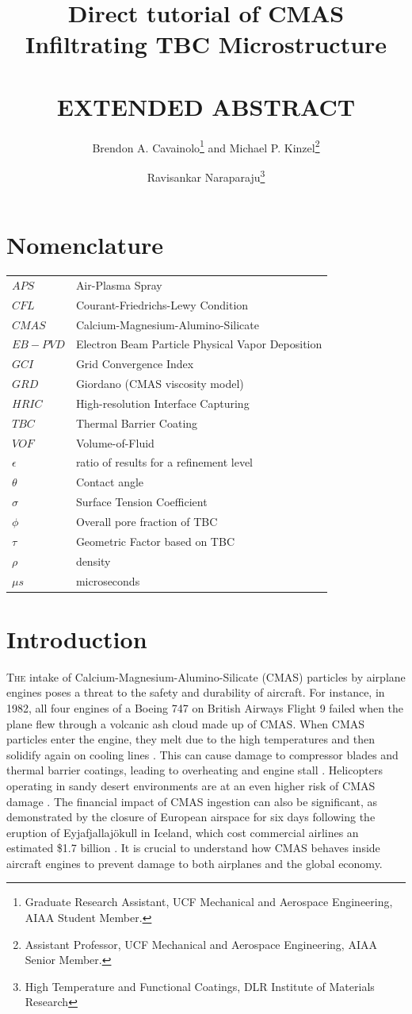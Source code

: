 \documentclass[conf]{new-aiaa}
\title{Direct tutorial of CMAS Infiltrating TBC Microstructure \\
\\
\textbf{EXTENDED ABSTRACT}}
\author{Brendon A. Cavainolo\footnote{Graduate Research Assistant, UCF Mechanical and Aerospace Engineering, AIAA Student Member.} and Michael P. Kinzel\footnote{Assistant Professor, UCF Mechanical and Aerospace Engineering, AIAA Senior Member.}}
\affil{University of Central Florida (UCF), Orlando, FL, 32816, United States}
\author{Ravisankar Naraparaju\footnote{High Temperature and Functional Coatings, DLR Institute of Materials Research}}
\affil{German Aerospace Center (DLR), Cologne, 51147. Germany}
\begin{document}
\section{Nomenclature}
{\renewcommand\arraystretch{1.0}
\noindent\begin{longtable*}{@{}l @{\quad=\quad} l@{}}
$APS$  & Air-Plasma Spray \\
$CFL$   & Courant-Friedrichs-Lewy Condition \\
$CMAS$  & Calcium-Magnesium-Alumino-Silicate \\
$EB-PVD$ &    Electron Beam Particle Physical Vapor Deposition \\
$GCI$ & Grid Convergence Index \\
$GRD$ & Giordano (CMAS viscosity model) \\
$HRIC$ & High-resolution Interface Capturing \\
$TBC$ & Thermal Barrier Coating \\
$VOF$ & Volume-of-Fluid \\
$\epsilon$ & ratio of results for a refinement level \\
$\theta$ & Contact angle \\
$\sigma$   & Surface Tension Coefficient \\
$\phi$ & Overall pore fraction of TBC \\
$\tau$ & Geometric Factor based on TBC \\
$\rho$ & density \\
$\mu s$ & microseconds
\end{longtable*}}

\section{Introduction}
\lettrine{T}{he} intake of Calcium-Magnesium-Alumino-Silicate (CMAS) particles by airplane engines poses a threat to the safety and durability of aircraft. For instance, in 1982, all four engines of a Boeing 747 on British Airways Flight 9 failed when the plane flew through a volcanic ash cloud made up of CMAS. When CMAS particles enter the engine, they melt due to the high temperatures and then solidify again on cooling lines \cite{Chen2015}. This can cause damage to compressor blades and thermal barrier coatings, leading to overheating and engine stall \cite{Chen2015}. Helicopters operating in sandy desert environments are at an even higher risk of CMAS damage \cite{Smialek}. The financial impact of CMAS ingestion can also be significant, as demonstrated by the closure of European airspace for six days following the eruption of Eyjafjallajökull in Iceland, which cost commercial airlines an estimated \$1.7 billion \cite{Thehumanconditionblog_2010}. It is crucial to understand how CMAS behaves inside aircraft engines to prevent damage to both airplanes and the global economy.
\end{document}
